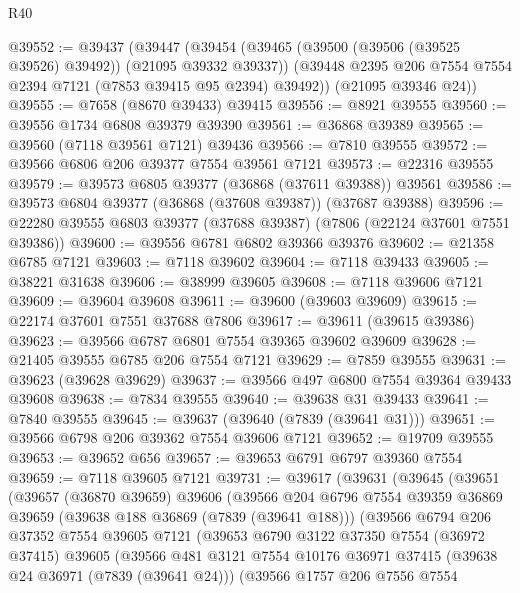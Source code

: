 \begin{lexlean}{R40}
\begin{coremodule}
@39552 := @39437
    (@39447
      (@39454
        (@39465 (@39500 (@39506 (@39525 @39526) @39492)) (@21095 @39332 @39337))
        (@39448 @2395 @206 @7554 @7554 @2394 @7121 (@7853 @39415 @95 @2394) @39492))
      (@21095 @39346 @24))
@39555 := @7658 (@8670 @39433) @39415
@39556 := @8921 @39555
@39560 := @39556 @1734 @6808 @39379 @39390
@39561 := @36868 @39389
@39565 := @39560 (@7118 @39561 @7121) @39436
@39566 := @7810 @39555
@39572 := @39566 @6806 @206 @39377 @7554 @39561 @7121
@39573 := @22316 @39555
@39579 := @39573 @6805 @39377 (@36868 (@37611 @39388)) @39561
@39586 := @39573 @6804 @39377 (@36868 (@37608 @39387)) (@37687 @39388)
@39596 := @22280 @39555 @6803 @39377 (@37688 @39387) (@7806 (@22124 @37601 @7551 @39386))
@39600 := @39556 @6781 @6802 @39366 @39376
@39602 := @21358 @6785 @7121
@39603 := @7118 @39602
@39604 := @7118 @39433
@39605 := @38221 @31638
@39606 := @38999 @39605
@39608 := @7118 @39606 @7121
@39609 := @39604 @39608
@39611 := @39600 (@39603 @39609)
@39615 := @22174 @37601 @7551 @37688 @7806
@39617 := @39611 (@39615 @39386)
@39623 := @39566 @6787 @6801 @7554 @39365 @39602 @39609
@39628 := @21405 @39555 @6785 @206 @7554 @7121
@39629 := @7859 @39555
@39631 := @39623 (@39628 @39629)
@39637 := @39566 @497 @6800 @7554 @39364 @39433 @39608
@39638 := @7834 @39555
@39640 := @39638 @31 @39433
@39641 := @7840 @39555
@39645 := @39637 (@39640 (@7839 (@39641 @31)))
@39651 := @39566 @6798 @206 @39362 @7554 @39606 @7121
@39652 := @19709 @39555
@39653 := @39652 @656
@39657 := @39653 @6791 @6797 @39360 @7554
@39659 := @7118 @39605 @7121
@39731 := @39617
    (@39631
      (@39645
        (@39651
          (@39657
            (@36870 @39659)
            @39606
            (@39566
              @204
              @6796
              @7554
              @39359
              @36869
              @39659
              (@39638 @188 @36869 (@7839 (@39641 @188)))
              (@39566
                @6794
                @206
                @37352
                @7554
                @39605
                @7121
                (@39653
                  @6790
                  @3122
                  @37350
                  @7554
                  (@36972 @37415)
                  @39605
                  (@39566
                    @481
                    @3121
                    @7554
                    @10176
                    @36971
                    @37415
                    (@39638 @24 @36971 (@7839 (@39641 @24)))
                    (@39566
                      @1757
                      @206
                      @7556
                      @7554

\end{coremodule}
\end{lexlean}
